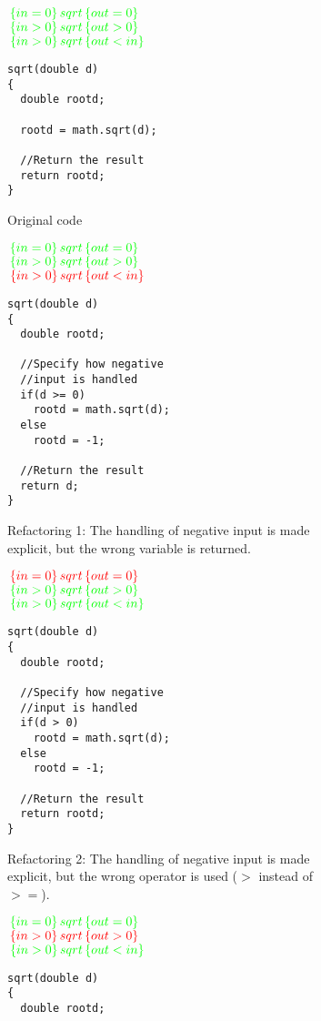 \documentclass[a4paper, fleqn]{article}
\begin{document}
\begin{figure}
\begin{subfigure}{.47\textwidth}
$\color{green}\, \{in = 0\}\,sqrt\, \{out = 0\}$\\
$\color{green}\, \{in > 0\}\,sqrt\, \{out > 0\}$\\
$\color{green}\, \{in > 0\}\,sqrt\, \{out < in\}$

\begin{lstlisting}
sqrt(double d)
{
  double rootd;

  rootd = math.sqrt(d);

  //Return the result
  return rootd;
}
\end{lstlisting}
\vspace{70pt}
\caption{Original code}
\end{subfigure}
\hfill
\begin{subfigure}{.47\textwidth}
$\color{green}\, \{in = 0\}\,sqrt\, \{out = 0\}$\\
$\color{green}\, \{in > 0\}\,sqrt\, \{out > 0\}$\\
$\color{red}\, \{in > 0\}\,sqrt\, \{out < in\}$
\begin{lstlisting}
sqrt(double d)
{
  double rootd;

  //Specify how negative 
  //input is handled
  if(d >= 0)
    rootd = math.sqrt(d);
  else
    rootd = -1;

  //Return the result
  return d;
}
\end{lstlisting}
\caption{Refactoring 1: The handling of negative input is made explicit, but the wrong variable is returned.}
\end{subfigure}

\vspace{30pt}
\begin{subfigure}{.47\textwidth}
$\color{red}\, \{in = 0\}\,sqrt\, \{out = 0\}$\\
$\color{green}\, \{in > 0\}\,sqrt\, \{out > 0\}$\\
$\color{green}\, \{in > 0\}\,sqrt\, \{out < in\}$
\begin{lstlisting}
sqrt(double d)
{
  double rootd;

  //Specify how negative 
  //input is handled
  if(d > 0)
    rootd = math.sqrt(d);
  else
    rootd = -1;

  //Return the result
  return rootd;
}
\end{lstlisting}
\caption{Refactoring 2: The handling of negative input is made explicit, but the wrong operator is used ($>$ instead of $>=$).}
\end{subfigure}
\hfill
\begin{subfigure}{.47\textwidth}
$\color{green}\, \{in = 0\}\,sqrt\, \{out = 0\}$\\
$\color{red}\, \{in > 0\}\,sqrt\, \{out > 0\}$\\
$\color{green}\, \{in > 0\}\,sqrt\, \{out < in\}$
\begin{lstlisting}
sqrt(double d)
{
  double rootd;


\end{lstlisting}
\end{subfigure}
\end{figure}
\end{document}
